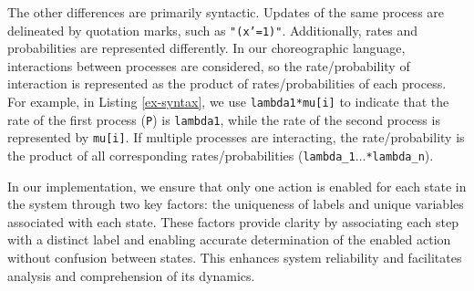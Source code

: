 The other differences are primarily syntactic. Updates of the same process are delineated by quotation marks, such as \texttt{"(x'=1)"}. Additionally, rates and probabilities are represented differently. In our choreographic language, interactions between processes are considered, so the rate/probability of interaction is represented as the product of rates/probabilities of each process. For example, in Listing \ref{ex-syntax}, we use \texttt{lambda1*mu[i]} to indicate that the rate of the first process (\texttt{P}) is \texttt{lambda1}, while the rate of the second process is represented by \texttt{mu[i]}. If multiple processes are interacting, the rate/probability is the product of all corresponding rates/probabilities (\texttt{lambda\_1$\ldots$*lambda\_n}).

In our implementation, we ensure that only one action is enabled for each state in the system through two key factors: the uniqueness of labels and unique variables associated with each state. These factors provide clarity by associating each step with a distinct label and enabling accurate determination of the enabled action without confusion between states. This enhances system reliability and facilitates analysis and comprehension of its dynamics.